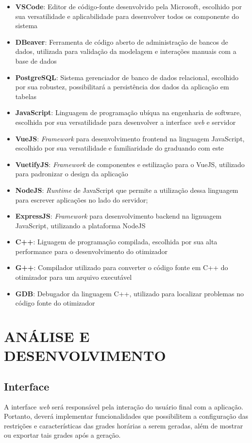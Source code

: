 \begin{itemize}
	\item \textbf{VSCode}: Editor de código-fonte desenvolvido pela Microsoft, escolhido por sua versatilidade e aplicabilidade para desenvolver todos os componente do sistema
	\item \textbf{DBeaver}: Ferramenta de código aberto de administração de bancos de dados, utilizada para validação da modelagem e interações manuais com a base de dados
	\item \textbf{PostgreSQL}: Sistema gerenciador de banco de dados relacional, escolhido por sua robustez, possibilitará a persistência dos dados da aplicação em tabelas
	\item \textbf{JavaScript}: Linguagem de programação ubíqua na engenharia de software, escolhida por sua versatilidade para desenvolver a interface \textit{web} e servidor
	\item \textbf{VueJS}: \textit{Framework} para desenvolvimento frontend na linguagem JavaScript, escolhido por sua versatilidade e familiaridade do graduando com este
	\item \textbf{VuetifyJS}: \textit{Framework} de componentes e estilização para o VueJS, utilizado para padronizar o design da aplicação
	\item \textbf{NodeJS}: \textit{Runtime} de JavaScript que permite a utilização dessa linguagem para escrever aplicações no lado do servidor;
	\item \textbf{ExpressJS}: \textit{Framework} para desenvolvimento backend na lignuagem JavaScript, utilizando a plataforma NodeJS
	\item \textbf{C++}: Liguagem de programação compilada, escolhida por sua alta performance para o desenvolvimento do otimizador
	\item \textbf{G++}: Compilador utilizado para converter o código fonte em C++ do otimizador para um arquivo executável 
	\item \textbf{GDB}: Debugador da linguagem C++, utilizado para localizar problemas no código fonte do otimizador
\end{itemize}

\section{ANÁLISE E DESENVOLVIMENTO}
\label{sec:analise_e_desenvolvimento}

\subsection{Interface}
A interface \textit{web} será responsável pela interação do usuário final com a aplicação. Portanto, deverá implementar funcionalidades que possibilitem a configuração das restrições e características das grades horárias a serem geradas, além de mostrar ou exportar tais grades após a geração.

